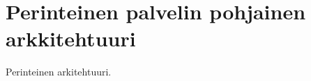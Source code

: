 \chapter{Perinteinen palvelin pohjainen arkkitehtuuri} \label{Perinteinen palvelin-pohjainen arkkitehtuuri}

Perinteinen arkitehtuuri.



